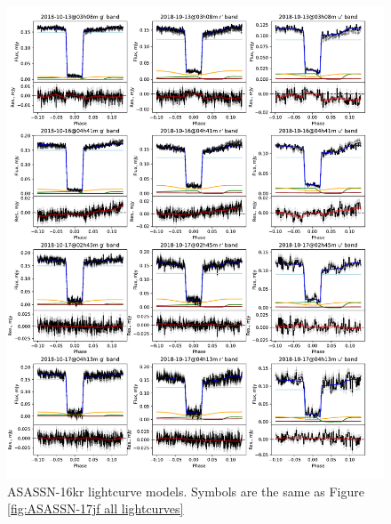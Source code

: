 \begin{figure}
    \centering
    \includegraphics[width=\columnwidth, trim={0 0cm 0 0}, clip]{figures/results/three_cvs_with_weird_colours/ASASSN-16kr/ASASSN-16kr_lightcurves_3.pdf}
    \caption{ASASSN-16kr lightcurve models. Symbols are the same as Figure \ref{fig:ASASSN-17jf all lightcurves}}
    \label{fig:ASASSN-16kr all lightcurves}
\end{figure}
